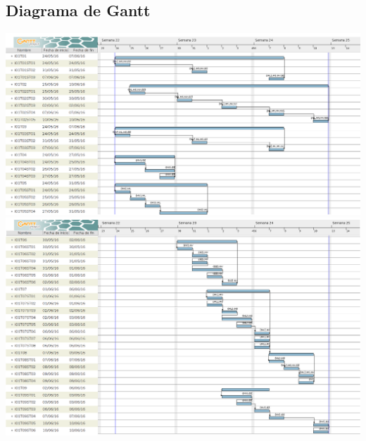 \subsection{Diagrama de Gantt}
  \includegraphics[scale=0.438, angle=90]{images/gantt1.png}
  \newpage
  \includegraphics[scale=0.45, angle=90]{images/gantt2.png}

